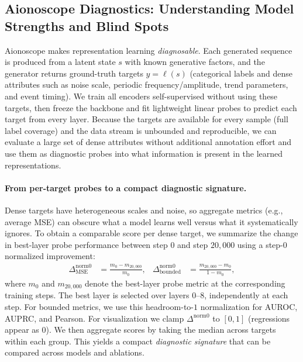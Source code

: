 \subsection{Aionoscope Diagnostics: Understanding Model Strengths and Blind Spots}
\label{sec:appendix_experiments_aionoscope_diagnostics}

Aionoscope makes representation learning \emph{diagnosable}. Each generated sequence is produced from a latent state $s$ with known generative factors, and the generator returns ground-truth targets $y=\ell(s)$ (categorical labels and dense attributes such as noise scale, periodic frequency/amplitude, trend parameters, and event timing). We train all encoders self-supervised without using these targets, then freeze the backbone and fit lightweight linear probes to predict each target from every layer. Because the targets are available for every sample (full label coverage) and the data stream is unbounded and reproducible, we can evaluate a large set of dense attributes without additional annotation effort and use them as diagnostic probes into what information is present in the learned representations.

\paragraph{From per-target probes to a compact diagnostic signature.}
Dense targets have heterogeneous scales and noise, so aggregate metrics (e.g., average MSE) can obscure what a model learns well versus what it systematically ignores. To obtain a comparable score per dense target, we summarize the change in best-layer probe performance between step $0$ and step $20{,}000$ using a step-$0$ normalized improvement:
\begin{align}
  \Delta^{\text{norm0}}_{\text{MSE}} &= \frac{m_0 - m_{20{,}000}}{m_0},
  &
  \Delta^{\text{norm0}}_{\text{bounded}} &= \frac{m_{20{,}000} - m_0}{1 - m_0},
\end{align}
where $m_0$ and $m_{20{,}000}$ denote the best-layer probe metric at the corresponding training steps. The best layer is selected over layers $0$--$8$, independently at each step. For bounded metrics, we use this headroom-to-$1$ normalization for AUROC, AUPRC, and Pearson. For visualization we clamp $\Delta^{\text{norm0}}$ to $[0,1]$ (regressions appear as $0$). We then aggregate scores by taking the median across targets within each group.
This yields a compact \emph{diagnostic signature} that can be compared across models and ablations.

